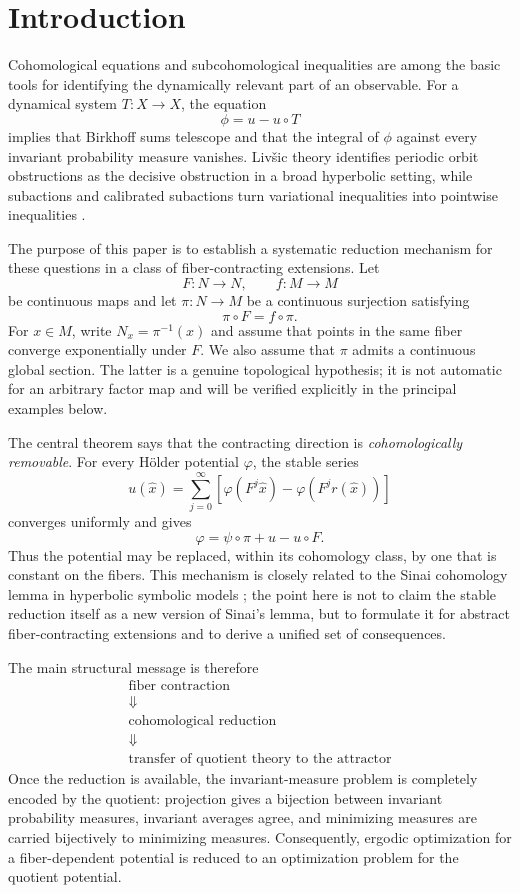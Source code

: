 \documentclass[11pt,a4paper]{article}
\begin{document}
\section{Introduction}

Cohomological equations and subcohomological inequalities are among the
basic tools for identifying the dynamically relevant part of an observable.
For a dynamical system $T:X\to X$, the equation
\[
\phi=u-u\circ T
\]
implies that Birkhoff sums telescope and that the integral of $\phi$ against
every invariant probability measure vanishes. Liv\v{s}ic theory identifies
periodic orbit obstructions as the decisive obstruction in a broad
hyperbolic setting, while subactions and calibrated subactions turn
variational inequalities into pointwise inequalities
\cite{Livsic,deLaLlaveMarcoMoriyon,BouschJenkinson,MbarkiSantana}.

The purpose of this paper is to establish a systematic reduction mechanism
for these questions in a class of fiber-contracting extensions. Let
\[
F:N\to N,\qquad f:M\to M
\]
be continuous maps and let $\pi:N\to M$ be a continuous surjection satisfying
\[
\pi\circ F=f\circ\pi.
\]
For $x\in M$, write $N_x=\pi^{-1}(x)$ and assume that points in the same
fiber converge exponentially under $F$. We also assume that $\pi$ admits a
continuous global section. The latter is a genuine topological hypothesis;
it is not automatic for an arbitrary factor map and will be verified
explicitly in the principal examples below.

The central theorem says that the contracting direction is
\emph{cohomologically removable}. For every H\"older potential $\varphi$,
the stable series
\[
u(\hat x)=\sum_{j=0}^{\infty}
\left[\varphi(F^j\hat x)-\varphi(F^jr(\hat x))\right]
\]
converges uniformly and gives
\[
\boxed{\varphi=\psi\circ\pi+u-u\circ F.}
\]
Thus the potential may be replaced, within its cohomology class, by one
that is constant on the fibers. This mechanism is closely related to the
Sinai cohomology lemma in hyperbolic symbolic models
\cite{Sinai}; the point here is not to claim the stable reduction itself as
a new version of Sinai's lemma, but to formulate it for abstract
fiber-contracting extensions and to derive a unified set of consequences.

The main structural message is therefore
\[
\boxed{
\begin{array}{c}
\text{fiber contraction}\\
\Downarrow\\
\text{cohomological reduction}\\
\Downarrow\\
\text{transfer of quotient theory to the attractor}
\end{array}}
\]
Once the reduction is available, the invariant-measure problem is completely
encoded by the quotient: projection gives a bijection between invariant
probability measures, invariant averages agree, and minimizing measures are
carried bijectively to minimizing measures. Consequently, ergodic
optimization for a fiber-dependent potential is reduced to an optimization
problem for the quotient potential.
\end{document}
